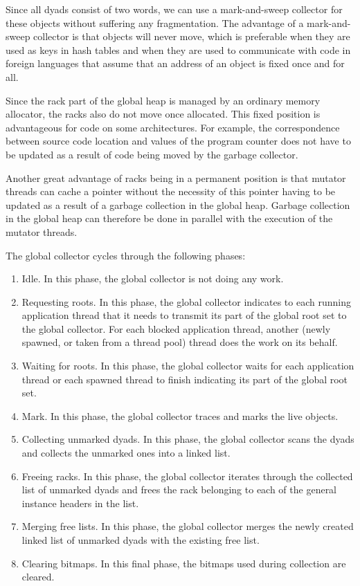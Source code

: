 Since all dyads consist of two words, we can use a mark-and-sweep
collector for these objects without suffering any fragmentation.  The
advantage of a mark-and-sweep collector is that objects will never
move, which is preferable when they are used as keys in hash tables
and when they are used to communicate with code in foreign languages
that assume that an address of an object is fixed once and for all.


Since the rack part of the global heap is managed by an ordinary
memory allocator, the racks also do not move once allocated.  This
fixed position is advantageous for code on some architectures.  For
example, the correspondence between source code location and values of
the program counter does not have to be updated as a result of code
being moved by the garbage collector.

Another great advantage of racks being in a permanent position is that
mutator threads can cache a pointer without the necessity of this
pointer having to be updated as a result of a garbage collection in
the global heap.  Garbage collection in the global heap can therefore
be done in parallel with the execution of the mutator threads.

The global collector cycles through the following phases:

\begin{enumerate}
\item Idle.  In this phase, the global collector is not doing any
  work.
\item Requesting roots.  In this phase, the global collector indicates
  to each running application thread that it needs to transmit its
  part of the global root set to the global collector.  For each
  blocked application thread, another (newly spawned, or taken
  from a thread pool) thread does the work on its behalf.
\item Waiting for roots.  In this phase, the global collector waits
  for each application thread or each spawned thread to finish
  indicating its part of the global root set.
\item Mark.  In this phase, the global collector traces and marks the
  live objects.
\item Collecting unmarked dyads.  In this phase, the global collector
  scans the dyads and collects the unmarked ones into a linked list.
\item Freeing racks.  In this phase, the global collector iterates
  through the collected list of unmarked dyads and frees the rack
  belonging to each of the general instance headers in the list.
\item Merging free lists.  In this phase, the global collector merges
  the newly created linked list of unmarked dyads with the existing
  free list.
\item Clearing bitmaps.  In this final phase, the bitmaps used during
  collection are cleared.
\end{enumerate}

